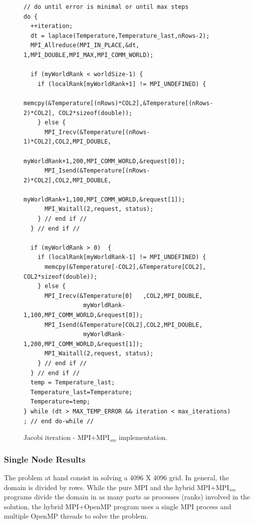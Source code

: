 \begin{figure} [h!]
\centering
\captionsetup{justification=centering, singlelinecheck=false}
\begin{lstlisting}[style=CStyle]
// do until error is minimal or until max steps
do {
  ++iteration;
  dt = laplace(Temperature,Temperature_last,nRows-2);
  MPI_Allreduce(MPI_IN_PLACE,&dt, 1,MPI_DOUBLE,MPI_MAX,MPI_COMM_WORLD);

  if (myWorldRank < worldSize-1) { 
    if (localRank[myWorldRank+1] != MPI_UNDEFINED) {
      memcpy(&Temperature[(nRows)*COL2],&Temperature[(nRows-2)*COL2], COL2*sizeof(double));
    } else {
      MPI_Irecv(&Temperature[(nRows-1)*COL2],COL2,MPI_DOUBLE,
                 myWorldRank+1,200,MPI_COMM_WORLD,&request[0]);
      MPI_Isend(&Temperature[(nRows-2)*COL2],COL2,MPI_DOUBLE,
                 myWorldRank+1,100,MPI_COMM_WORLD,&request[1]);
      MPI_Waitall(2,request, status);
    } // end if //  
  } // end if //  

  if (myWorldRank > 0)  {
    if (localRank[myWorldRank-1] != MPI_UNDEFINED) {
      memcpy(&Temperature[-COL2],&Temperature[COL2], COL2*sizeof(double));
    } else {
      MPI_Irecv(&Temperature[0]   ,COL2,MPI_DOUBLE,
                 myWorldRank-1,100,MPI_COMM_WORLD,&request[0]);
      MPI_Isend(&Temperature[COL2],COL2,MPI_DOUBLE,
                 myWorldRank-1,200,MPI_COMM_WORLD,&request[1]);
      MPI_Waitall(2,request, status);
    } // end if //
  } // end if //
  temp = Temperature_last;
  Temperature_last=Temperature;
  Temperature=temp;        
} while (dt > MAX_TEMP_ERROR && iteration < max_iterations) ; // end do-while //
\end{lstlisting}    
\caption{Jacobi iteration - MPI+MPI$_{sm}$ implementation.}
\label{fig:JacobiMPI+MPI}
\end{figure}


\subsubsection*{Single Node Results}

The problem at hand consist in solving a 4096 X 4096 grid. In general, the domain is divided by rows. While the pure MPI and the hybrid MPI+MPI$_{sm}$ programs divide the domain in as many parts as processes (ranks) involved in the solution, the hybrid MPI+OpenMP program uses a single MPI process and multiple OpenMP threads to solve the problem.

\medskip

